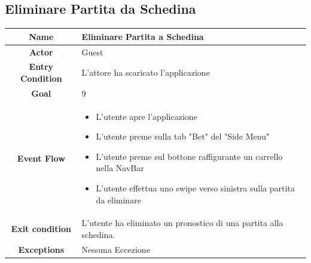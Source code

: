\documentclass[numbers=noenddot, 12pt, a4paper, oneside]{scrbook}
\begin{document}
\subsection*{Eliminare Partita da Schedina}
\begin{tabular}{|c|p{}|}
	\hline
	\parbox[c][6ex]{6ex}{\centering \textbf{Name}} & Eliminare Partita a Schedina\\
	\hline
	\parbox[c][6ex]{6ex}{\centering \textbf{Actor}} & Guest \\
	\hline
	\parbox[c][10ex]{15ex}{\centering \textbf{Entry Condition}} & L'attore ha scaricato l'applicazione\\
	\hline
	\parbox[c][6ex]{15ex}{\centering \textbf{Goal}} &  9\\
	\hline
	\parbox[c][10ex]{12ex}{\centering \textbf{Event Flow}} & \begin{itemize}
		\item L'utente apre l'applicazione
		\item L'utente preme sulla tab "Bet" del "Side Menu"
		\item L'utente preme sul bottone raffigurante un carrello nella NavBar
		\item L'utente effettua uno swipe verso sinistra sulla partita da eliminare
	\end{itemize}\\
	\hline
	\parbox[c][7ex]{12ex}{\centering \textbf{Exit condition}} & L'utente ha eliminato un pronostico di una partita alla schedina.\\\hline
	\parbox[c][10ex]{13ex}{\centering \textbf{Exceptions}} & Nessuna Eccezione\\ \hline	
\end{tabular}
\newpage
\end{document}
